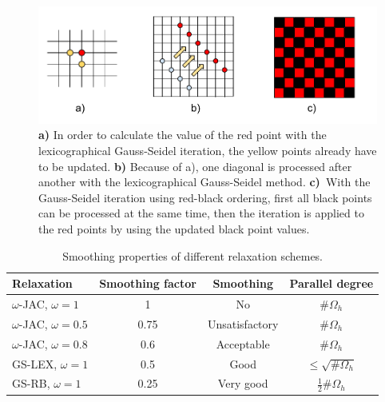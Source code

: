 \begin{figure}[h]
	\centering
	\includegraphics[width=1.\textwidth]{chapters/chapter02/mg_parallel_properties}
	\caption{\textbf{a)} In order to calculate the value of the red point with the lexicographical Gauss-Seidel iteration, the yellow points already have to be updated. \textbf{b)} Because of a), one diagonal is processed after another with the lexicographical Gauss-Seidel method. \textbf{c)}~With the Gauss-Seidel iteration using red-black ordering, first all black points can be processed at the same time, then the iteration is applied to the red points by using the updated black point values.}
	\label{fig:mg_parallel_properties}
\end{figure}

\begin{table}[]
\centering
\caption{Smoothing properties of different relaxation schemes.}
\label{table:smoothing}
\begin{tabular}{lccc}
\hline
\multicolumn{1}{l}{Relaxation} & \multicolumn{1}{l}{Smoothing factor} & Smoothing & \multicolumn{1}{l}{Parallel degree} \\ \hline
$\omega$-JAC, $\omega = 1$     & 1                                    & No                            & \#$\Omega_h$                        \\
$\omega$-JAC, $\omega = 0.5$   & 0.75                                 & Unsatisfactory                & \#$\Omega_h$                        \\
$\omega$-JAC, $\omega = 0.8$   & 0.6                                  & Acceptable                    & \#$\Omega_h$                        \\
GS-LEX, $\omega = 1$           & 0.5                                  & Good                          & $\leq \sqrt{\#\Omega_h}$        \\
GS-RB, $\omega = 1$            & 0.25                                 & Very good                     & $\frac{1}{2}\#\Omega_h$                         
\end{tabular}
\end{table}

